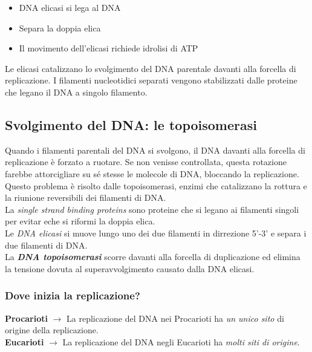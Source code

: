 \documentclass{article}
\begin{document}
\begin{itemize}
    \item DNA elicasi si lega al DNA 
    \item Separa la doppia elica 
    \item Il movimento dell'elicasi richiede idrolisi di ATP 
\end{itemize}

Le elicasi catalizzano lo svolgimento del DNA parentale davanti alla forcella di replicazione. I filamenti nucleotidici separati vengono stabilizzati dalle proteine che legano il DNA a singolo filamento.

\subsection{Svolgimento del DNA: le topoisomerasi} Quando i filamenti parentali del DNA si svolgono, il DNA davanti alla forcella di replicazione è forzato a ruotare. Se non venisse controllata, questa rotazione farebbe attorcigliare su sé stesse le molecole di DNA, bloccando la replicazione. 
\\[1ex]
Questo problema è risolto dalle topoisomerasi, enzimi che catalizzano la rottura e la riunione reversibili dei filamenti di DNA. 
\\[1ex]
\tab La \textit{single strand binding proteins} sono proteine che si legano ai filamenti singoli per evitar eche si riformi la doppia elica. 
\\[1ex]
\tab Le \textit{DNA elicasi} si muove lungo uno dei due filamenti in dirrezione 5'-3' e separa i due filamenti di DNA. 
\\[1ex]
\tab La \textit{\textbf{DNA topoisomerasi}} scorre davanti alla forcella di duplicazione ed elimina la tensione dovuta al superavvolgimento causato dalla DNA elicasi. 

\subsubsection{Dove inizia la replicazione?} \textbf{Procarioti} $ \rightarrow $ La replicazione del DNA nei Procarioti ha \textit{un unico sito} di origine della replicazione.\\
\textbf{Eucarioti} $\rightarrow$ La replicazione del DNA negli Eucarioti ha \textit{molti siti di origine}.
\end{document}
